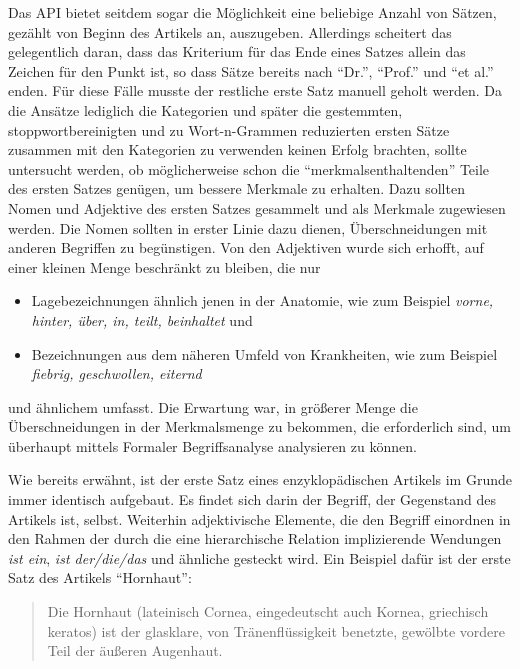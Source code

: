 \documentclass[pagesize,DIV=calc,12pt,final]{scrreprt}
\begin{document}
Das API bietet seitdem sogar die Möglichkeit eine beliebige Anzahl von Sätzen, gezählt von Beginn des Artikels an, auszugeben. 
Allerdings scheitert das gelegentlich daran, dass das Kriterium für das Ende eines Satzes allein das Zeichen für den Punkt ist, so dass Sätze bereits nach \enquote{Dr.}, \enquote{Prof.} und \enquote{et al.} enden. 
Für diese Fälle musste der restliche erste Satz manuell geholt werden. 
Da die Ansätze lediglich die Kategorien und später die gestemmten, stoppwortbereinigten und zu Wort-n-Grammen reduzierten ersten Sätze zusammen mit den Kategorien zu verwenden keinen Erfolg brachten, sollte untersucht werden, ob möglicherweise schon die \enquote{merkmalsenthaltenden} Teile des ersten Satzes genügen, um bessere Merkmale zu erhalten. 
Dazu sollten Nomen und Adjektive des ersten Satzes gesammelt und als Merkmale zugewiesen werden. 
Die Nomen sollten in erster Linie dazu dienen, Überschneidungen mit anderen Begriffen zu begünstigen. 
Von den Adjektiven wurde sich erhofft, auf einer kleinen Menge beschränkt zu bleiben, die nur 

\begin{itemize}
\item Lagebezeichnungen ähnlich jenen in der Anatomie, wie zum Beispiel \textit{vorne, hinter, über, in, teilt, beinhaltet} und
\item Bezeichnungen aus dem näheren Umfeld von Krankheiten, wie zum Beispiel \textit{fiebrig, geschwollen, eiternd}
\end{itemize}

und ähnlichem umfasst. 
Die Erwartung war, in größerer Menge die Überschneidungen in der Merkmalsmenge zu bekommen, die erforderlich sind, um überhaupt mittels Formaler Begriffsanalyse analysieren zu können. 

Wie bereits erwähnt, ist der erste Satz eines enzyklopädischen Artikels im Grunde immer identisch aufgebaut. 
Es findet sich darin der Begriff, der Gegenstand des Artikels ist, selbst. 
Weiterhin adjektivische Elemente, die den Begriff einordnen in den Rahmen der durch die eine hierarchische Relation implizierende Wendungen \textit{ist ein}, \textit{ist der/die/das} und ähnliche gesteckt wird. 
Ein Beispiel dafür ist der erste Satz des Artikels \enquote{Hornhaut}: 

\begin{quote}
Die Hornhaut (lateinisch Cornea, eingedeutscht auch Kornea, griechisch keratos) ist der glasklare, von Tränenflüssigkeit benetzte, gewölbte vordere Teil der äußeren Augenhaut. 
\end{quote}
\end{document}
